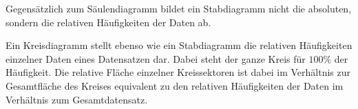 \pagebreak


Gegens\"{a}tzlich zum S\"{a}ulendiagramm bildet ein Stabdiagramm nicht die absoluten, sondern die relativen H\"{a}ufigkeiten der Daten ab.

\begin{figure}[h!]
\end{figure} 


Ein Kreisdiagramm stellt ebenso wie ein Stabdiagramm die relativen H\"{a}ufigkeiten einzelner Daten eines Datensatzen dar. Dabei steht der ganze Kreis f\"{u}r $100 \%$ der H\"{a}ufigkeit. Die relative Fl\"{a}che einzelner Kreissektoren ist dabei im Verh\"{a}ltnis zur Gesamtfl\"{a}che des Kreises equivalent zu den relativen H\"{a}ufigkeiten der Daten im Verh\"{a}ltnis zum Gesamtdatensatz.

\begin{figure}[h!]
\end{figure}

\pagebreak



